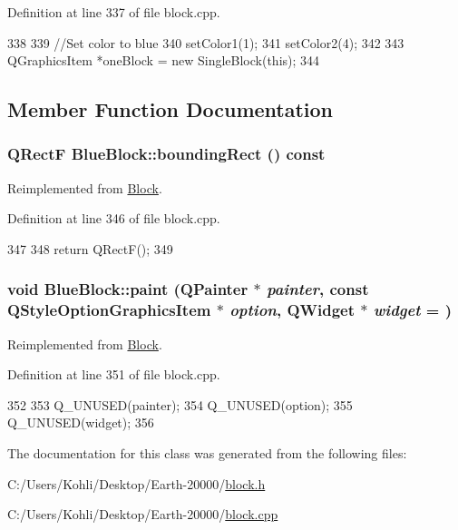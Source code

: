Definition at line 337 of file block.cpp.


\begin{DoxyCode}
338 {
339     //Set color to blue
340     setColor1(1);
341     setColor2(4);
342 
343     QGraphicsItem *oneBlock = new SingleBlock(this);
344 }
\end{DoxyCode}


\subsection{Member Function Documentation}
\hypertarget{class_blue_block_ae83a63d0611bc918f93d7019b4b27056}{
\subsubsection[{boundingRect}]{\setlength{\rightskip}{0pt plus 5cm}QRectF BlueBlock::boundingRect () const}}
\label{class_blue_block_ae83a63d0611bc918f93d7019b4b27056}


Reimplemented from \hyperlink{class_block_aee4444b92a82f5a8080e9019ef1e554d}{Block}.

Definition at line 346 of file block.cpp.


\begin{DoxyCode}
347 {
348     return QRectF();
349 }
\end{DoxyCode}
\hypertarget{class_blue_block_adc28e68ba0fa2c578815b77dde03ebdb}{
\subsubsection[{paint}]{\setlength{\rightskip}{0pt plus 5cm}void BlueBlock::paint (QPainter $\ast$ {\em painter}, \/  const QStyleOptionGraphicsItem $\ast$ {\em option}, \/  QWidget $\ast$ {\em widget} = {})}}
\label{class_blue_block_adc28e68ba0fa2c578815b77dde03ebdb}


Reimplemented from \hyperlink{class_block_a36791d086b6fad1a2203bfef6fdbaa0a}{Block}.

Definition at line 351 of file block.cpp.


\begin{DoxyCode}
352 {
353     Q_UNUSED(painter);
354     Q_UNUSED(option);
355     Q_UNUSED(widget);
356 }
\end{DoxyCode}


The documentation for this class was generated from the following files:\begin{DoxyCompactItemize}
\item 
C:/Users/Kohli/Desktop/Earth-\/20000/\hyperlink{block_8h}{block.h}\item 
C:/Users/Kohli/Desktop/Earth-\/20000/\hyperlink{block_8cpp}{block.cpp}\end{DoxyCompactItemize}
